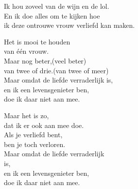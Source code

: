 \clearpage
\begin{translation}
Ik hou zoveel van de wijn en de lol.\\
En ik doe alles om te kijken hoe\\
ik deze ontrouwe vrouw verliefd kan maken.\vspace{\wlskip}

Het is mooi te houden\\
van één vrouw.\\
Maar nog beter,(veel beter)\\
van twee of drie.(van twee of meer)\\
Maar omdat de liefde verraderlijk is,\\
en ik een levensgenieter ben,\\
doe ik daar niet aan mee.\vspace{\wlskip}

Maar het is zo,\\
dat ik er ook aan mee doe.\\
Als je verliefd bent,\\
ben je toch verloren.\\
Maar omdat de liefde verraderlijk\\ is,\\
en ik een levensgenieter ben,\\
doe ik daar niet aan mee.\\
\end{translation}

